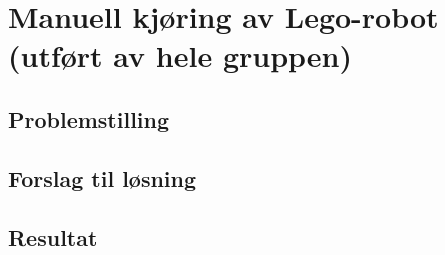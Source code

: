 

\chapter{Manuell kjøring av Lego-robot (utført av hele 
  gruppen)}\label{kap:prosjekt04}


\section{Problemstilling}


\section{Forslag til løsning}


\section{Resultat}
